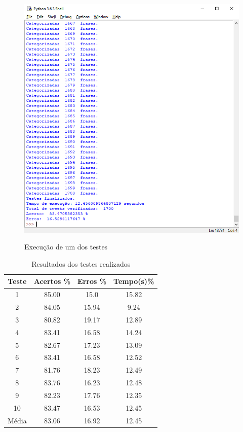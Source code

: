 \documentclass[
article,			%
12pt,				%
a4paper,			%
english,			%
brazil,				%
sumario=tradicional,
twoside
]{abntex2}
\begin{document}
		\begin{figure}[h!]
			\centering
			\caption{Execução de um dos testes}
			\includegraphics[scale=1]{teste1.png}
			\label{fig: teste1}
		\end{figure}
	
		\begin{table}[!h]
			\caption{Resultados dos testes realizados}
			\label{tab: testes}
			\centering
			
			\begin{tabular}{|c|c|c|c|} \hline
				\textbf{Teste} & \textbf{Acertos \%} & \textbf{Erros \%} & \textbf{Tempo(s)\%} \\
				\hline
				1 & 85.00 & 15.0 & 15.82\\
				2 & 84.05 & 15.94 & 9.24 \\
				3 & 80.82 & 19.17 & 12.89 \\
				4 & 83.41 & 16.58 & 14.24\\
				5 & 82.67 & 17.23 & 13.09 \\
				6 & 83.41 & 16.58 & 12.52\\
				7 & 81.76 & 18.23 & 12.49\\
				8 & 83.76 & 16.23 & 12.48\\
				9 & 82.23 & 17.76 & 12.35\\
				10 & 83.47 & 16.53 & 12.45\\
				\hline
				Média & 83.06  &  16.92  & 12.45 \\
				\hline
				
			\end{tabular}
			
		\end{table}
		
\end{document}
